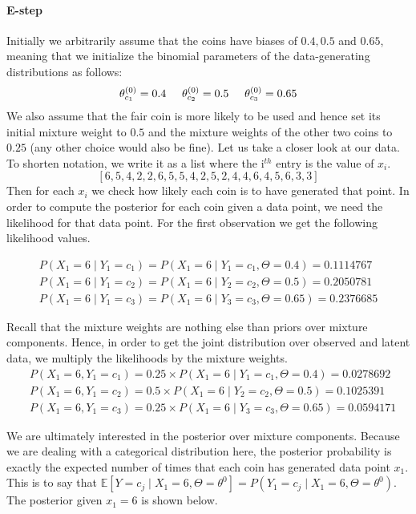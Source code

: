 \documentclass[a4paper,11pt,leqno]{report}\usepackage[]{graphicx}\usepackage[]{color}
\newcommand{\E}{\mathbb{E}}
\begin{document}
\paragraph{E-step} Initially we arbitrarily assume that the coins have biases of $ 0.4, 0.5  $ and $ 0.65 $, meaning that we initialize the binomial parameters of the data-generating
distributions as follows:
\begin{equation}
\theta^{(0)}_{c_{1}} = 0.4 \hskip 0.5cm  \theta^{(0)}_{c_{2}} = 0.5 \hskip 0.5cm  \theta^{(0)}_{c_{3}} = 0.65
\end{equation}
We also assume that the fair coin is more likely to be used and hence set its initial mixture weight to $ 0.5 $ and the mixture weights of the 
other two coins to $ 0.25 $ (any other choice would also be fine). Let 
us take a closer look at our data. To shorten notation, we write it as a list where the i$ ^{th} $ entry is the value of $ x_{i} $.
$$ \left[ 6, 5, 4, 2, 2, 6, 5, 5, 4, 2, 5, 2, 4, 4, 6, 4, 5, 6, 3, 3 \right] $$ 
Then for each $ x_{i} $ we check how likely each coin is to have generated that point. In order to compute the posterior for each coin given a data point, we need
the likelihood for that data point. For the first observation we get the following likelihood values.


\begin{align}
&P(X_{1}=6 \mid Y_{1} = c_{1}) = P(X_{1}=6 \mid Y_{1}=c_{1},\Theta = 0.4) = 0.1114767& \\
&P(X_{1}=6 \mid Y_{1} = c_{2}) = P(X_{1}=6 \mid Y_{2}=c_{2},\Theta = 0.5) = 0.2050781& \nonumber \\ 
&P(X_{1}=6 \mid Y_{1} = c_{3}) = P(X_{1}=6 \mid Y_{3}=c_{3},\Theta = 0.65) = 0.2376685& \nonumber
\end{align}

Recall that the mixture weights are nothing else than priors over mixture components. Hence, in order to get the joint distribution over observed and
latent data, we multiply the likelihoods by the mixture weights.
\begin{align}
&P(X_{1}=6,Y_{1} = c_{1}) = 0.25 \times P(X_{1}=6 \mid Y_{1}=c_{1},\Theta = 0.4) = 0.0278692 \\
&P(X_{1}=6,Y_{1} = c_{2}) = 0.5 \times P(X_{1}=6 \mid Y_{2}=c_{2},\Theta = 0.5) = 0.1025391 \nonumber \\ 
&P(X_{1}=6,Y_{1} = c_{3}) = 0.25 \times P(X_{1}=6 \mid Y_{3}=c_{3},\Theta = 0.65) = 0.0594171 \nonumber
\end{align}

We are ultimately interested in the posterior over mixture components. Because we are dealing with a categorical
distribution here, the posterior probability is exactly the expected
number of times that each coin has generated data point $ x_{1} $. This is to say that
$\E[Y=c_{j} \mid X_{1}=6, \Theta = \theta^{0}] = P(Y_{1}=c_{j} \mid X_{1}=6, \Theta=\theta^{0}) $. The
posterior given $ x_{1}=6 $ is shown below.
\end{document}
